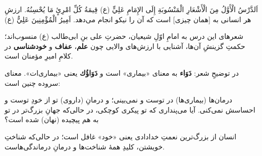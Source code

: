 
\Lesson
  {اَلدَّرْسُ الْأَوَّلُ}
  {مِنَ الْأَشْعَارِ الْمَنْسُوبَةِ إِلَى الإِمَامِ عَلِيٍّ (ع)}
  {قِيمَةُ كُلِّ امْرِئٍ مَا يُحْسِنُهُ.}
  {ارزشِ هر انسانی به [همان چیزی] است که آن را نیکو انجام می‌دهد.}
  {اَمِيرُ الْمُؤْمِنِينَ عَلِيٌّ (ع)}



\begin{JNass}
شعرهای این درس به امامِ اوّلِ شیعیان، حضرتِ علی بنِ ابی‌طالب (ع) منسوب‌اند؛
حکمتِ گزینشِ آن‌ها، آشنایی با ارزش‌های والایی چون \textbf{علم}، \textbf{عفاف}
و \textbf{خودشناسی} در کلامِ امیرِ مؤمنان است.
\end{JNass}

\begin{JNass}
\begin{JPoem}
\end{JPoem}
\end{JNass}

\begin{JTarjome}
در توضیحِ شعر: \textbf{دَوَاء} به معنای «بیماری» است و \textbf{دَوَاؤُك} یعنی
«بیماری‌ات». معنای سروده چنین است:

درمان‌ها (بیماری‌ها) در توست و نمی‌بینی؛ و درمانِ (داروی) تو از خودِ توست و
احساسش نمی‌کنی. آیا می‌پنداری که تو پیکری کوچکی، در حالی‌که جهانِ بزرگ‌تر در
تو به هم پیچیده (نهان) شده است؟

انسان از بزرگ‌ترین نعمتِ خدادادی یعنی «خود» غافل است؛ در حالی‌که شناختِ خویشتن،
کلیدِ همهٔ شناخت‌ها و درمانِ درماندگی‌هاست.
\end{JTarjome}

